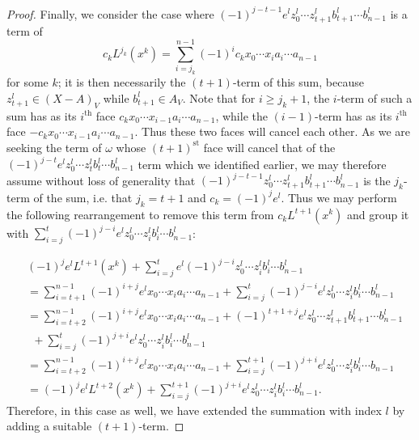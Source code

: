 \documentclass[11pt]{article}
\theoremstyle{definition}
\numberwithin{equation}{section}
\begin{document}
\begin{proof}
Finally, we consider the case where $(-1)^{j-t-1} e^l z^l_0 \cdots z^l_{t+1} b^l_{t+1} \cdots b^l_{n-1}$ is a term of 
\[c_k L^{j_k}(x^k) = \sum\limits_{i = j_k}^{n-1}(-1)^{i} c_k  x_0 \cdots x_i a_i \cdots a_{n-1}\]
for some $k$; it is then necessarily the $(t+1)$-term of this sum, because $z^l_{t+1} \in (X - A)_V$ while $b^l_{t+1} \in A_V$. 
Note that for $i \geq j_k + 1$, the $i$-term of such a sum has as its $i^{\mathrm{th}}$ face $c_k x_0 \cdots x_{i-1} a_i \cdots a_{n-1}$, while the $(i-1)$-term has as its $i^{\mathrm{th}}$ face $-c_k x_0 \cdots x_{i-1} a_i \cdots a_{n-1}$. Thus these two faces will cancel each other. As we are seeking the term of $\omega$ whose $(t+1)^{\mathrm{st}}$ face will cancel that of the $(-1)^{j-t} e^l z^l_0 \cdots z^l_t b^l_t \cdots b^l_{n-1}$ term which we identified earlier, we may therefore assume without loss of generality that $(-1)^{j-t-1} z^l_0 \cdots z^l_{t+1} b^l_{t+1} \cdots b^l_{n-1}$ is the $j_k$-term of the sum, i.e.  that $j_k = t + 1$ and $c_k = (-1)^j e^l$. Thus we may perform the following rearrangement to remove this term from $c_k L^{t+1}(x^k)$ and group it with $\sum_{i = j}^{t} (-1)^{j-i} e^l z^l_0 \cdots z^l_i b^l_i \cdots b^l_{n-1}$:

\begin{align*}
& (-1)^j e^l L^{t+1}(x^k) + \sum_{i = j}^{t} e^l (-1)^{j-i} z^l_0 \cdots z^l_i b^l_i \cdots b^l_{n-1} \\
&= \sum\limits_{i = t+1}^{n-1} (-1)^{i+j} e^l x_0 \cdots x_i a_i \cdots a_{n-1} + \sum_{i = j}^{t} (-1)^{j-i} e^l z^l_0 \cdots z^l_i b^l_i \cdots b^l_{n-1} \\
&= \sum\limits_{i = t + 2}^{n-1} (-1)^{i+j} e^l x_0 \cdots x_i a_i \cdots a_{n-1} + (-1)^{t+1+j} e^l z^l_0 \cdots z^l_{t+1} b^l_{t+1} \cdots b^l_{n-1} \\ 
&\ \ + \sum_{i = j}^{t} (-1)^{j+i} e^l z^l_0 \cdots z^l_i b^l_i \cdots b^l_{n-1} \\
&= \sum\limits_{i = t + 2}^{n-1} (-1)^{i+j} e^l x_0 \cdots x_i a_i \cdots a_{n-1} + \sum_{i = j}^{t+1} (-1)^{j+i} e^l z^l_0 \cdots z^l_i b^l_i \cdots b_{n-1} \\
&= (-1)^{j} e^l L^{t+2}(x^k) + \sum_{i = j}^{t+1} (-1)^{j+i} e^l z^l_0 \cdots z^l_i b^l_i \cdots b^l_{n-1}.
\end{align*}
Therefore, in this case as well, we have extended the summation with index $l$ by adding a suitable $(t+1)$-term.


\end{proof}
\end{document}
